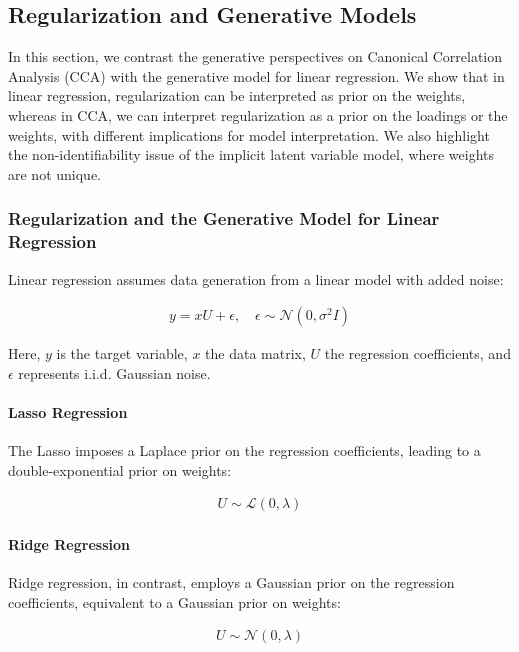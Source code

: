 \subsection{Regularization and Generative Models}

In this section, we contrast the generative perspectives on Canonical Correlation Analysis (CCA) with the generative model for linear regression.
We show that in linear regression, regularization can be interpreted as prior on the weights, whereas in CCA, we can interpret regularization as a prior on the loadings or the weights, with different implications for model interpretation.
We also highlight the non-identifiability issue of the implicit latent variable model, where weights are not unique.

\subsubsection{Regularization and the Generative Model for Linear Regression}
Linear regression assumes data generation from a linear model with added noise:

\begin{align}
    y = xU + \epsilon, \quad \epsilon \sim \mathcal{N}(0, \sigma^2 I)
\end{align}

Here, $y$ is the target variable, $x$ the data matrix, $U$ the regression coefficients, and $\epsilon$ represents i.i.d. Gaussian noise.

\paragraph{Lasso Regression}
The Lasso imposes a Laplace prior on the regression coefficients, leading to a double-exponential prior on weights:

\begin{align}
    U \sim \mathcal{L}(0, \lambda)
\end{align}

\paragraph{Ridge Regression}
Ridge regression, in contrast, employs a Gaussian prior on the regression coefficients, equivalent to a Gaussian prior on weights:

\begin{align}
    U \sim \mathcal{N}(0, \lambda)
\end{align}

